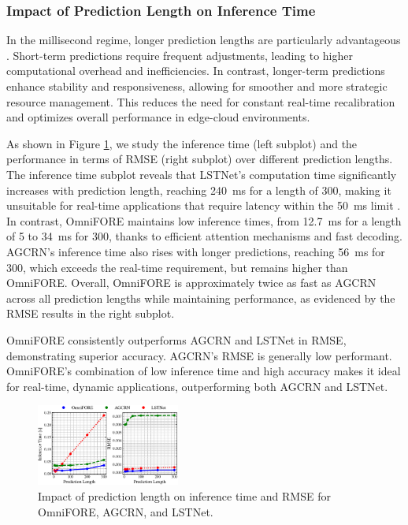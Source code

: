 \documentclass{ieeetmlcn}
\begin{document}
\subsubsection{\textbf{Impact of Prediction Length on Inference Time}}

In the millisecond regime, longer prediction lengths are particularly advantageous \cite{9500858}. Short-term predictions require frequent adjustments, leading to higher computational overhead and inefficiencies. In contrast, longer-term predictions enhance stability and responsiveness, allowing for smoother and more strategic resource management. This reduces the need for constant real-time recalibration and optimizes overall performance in edge-cloud environments.

As shown in Figure \ref{fig:pred_vs_inf}, we study the inference time (left subplot) and the performance in terms of RMSE (right subplot) over different prediction lengths. The inference time subplot reveals that LSTNet's computation time significantly increases with prediction length, reaching \SI{240}{\milli\second} for a length of 300, making it unsuitable for real-time applications that require latency within the \SI{50}{\milli\second} limit \cite{8334540}. In contrast, OmniFORE maintains low inference times, from \SI{12.7}{\milli\second} for a length of 5 to \SI{34}{\milli\second} for 300, thanks to efficient attention mechanisms and fast decoding. AGCRN's inference time also rises with longer predictions, reaching \SI{56}{\milli\second} for 300, which exceeds the real-time requirement, but remains higher than OmniFORE. Overall, OmniFORE is approximately twice as fast as AGCRN across all prediction lengths while maintaining performance, as evidenced by the RMSE results in the right subplot.

OmniFORE consistently outperforms AGCRN and LSTNet in RMSE, demonstrating superior accuracy. AGCRN's RMSE is generally low performant. OmniFORE's combination of low inference time and high accuracy makes it ideal for real-time, dynamic applications, outperforming both AGCRN and LSTNet.

\begin{figure}\centering%
\centering
\includegraphics[width=0.42\textwidth]{img/pred_vs_inf.eps}
\caption{Impact of prediction length on inference time and RMSE for OmniFORE, AGCRN, and LSTNet.}
\label{fig:pred_vs_inf}
\end{figure}
\end{document}
